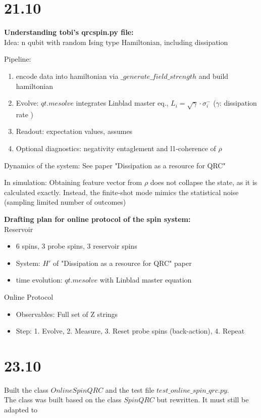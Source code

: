 \section*{21.10}

\textbf{Understanding tobi's qrcspin.py file:} \\
Idea:
n qubit with random Ising type Hamiltonian, including dissipation

Pipeline:
\begin{enumerate}
    \item encode data into hamiltonian via $\_generate\_field\_strength$ and build hamiltonian
    \item Evolve: $qt.mesolve$ integrates Linblad master eq., $L_i = \sqrt{\gamma} \cdot \sigma_i^- $ ($\gamma$: dissipation rate )
    \item Readout: expectation values, assumes 
    \item Optional diagnostics: negativity entaglement and l1-coherence of $\rho$
\end{enumerate}

Dynamics of the system: See paper "Dissipation as a resource for QRC" 

In simulation: Obtaining feature vector from $\rho$ does not collapse the state, as it is calculated exactly. 
Instead, the finite-shot mode mimics the statistical noise (sampling limited number of outcomes)

\textbf{Drafting plan for online protocol of the spin system:} \\
Reservoir
\begin{itemize}
    \item 6 spins, 3 probe spins, 3 reservoir spins
    \item System: $H'$ of "Dissipation as a resource for QRC" paper
    \item time evolution: $qt.mesolve$ with Linblad master equation
\end{itemize}

Online Protocol
\begin{itemize}
    \item Observables: Full set of Z strings
    \item Step: 1. Evolve, 2. Measure, 3. Reset probe spins (back-action), 4. Repeat
\end{itemize}


\section*{23.10}
Built the class $OnlineSpinQRC$ and  the test file $test\_online\_spin\_qrc.py$. \\
The class was built based on the class $SpinQRC$ but rewritten. It must still be adapted to 

